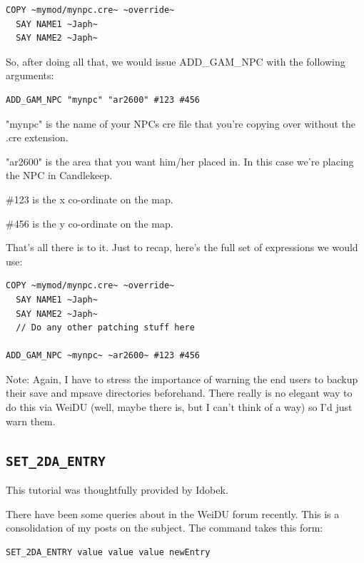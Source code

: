 \documentclass{article}
\def\ttref#1{\ahrefloc{#1}{\tt #1}}
\def\t#1{{\tt #1}}
\begin{document}
\begin{verbatim}
COPY ~mymod/mynpc.cre~ ~override~
  SAY NAME1 ~Japh~
  SAY NAME2 ~Japh~
\end{verbatim}

So, after doing all that, we would issue ADD_GAM_NPC with the following
arguments:

\begin{verbatim}
ADD_GAM_NPC "mynpc" "ar2600" #123 #456
\end{verbatim}

"mynpc" is the name of your NPCs cre file that you're copying over without
the .cre extension.

"ar2600" is the area that you want him/her placed in.  In this case we're
placing the NPC in Candlekeep.

\#123 is the x co-ordinate on the map.

\#456 is the y co-ordinate on the map.

That's all there is to it.  Just to recap, here's the full set of
expressions we would use:

\begin{verbatim}
COPY ~mymod/mynpc.cre~ ~override~
  SAY NAME1 ~Japh~
  SAY NAME2 ~Japh~
  // Do any other patching stuff here

ADD_GAM_NPC ~mynpc~ ~ar2600~ #123 #456
\end{verbatim}

Note: Again, I have to stress the importance of warning the end users to
backup their save and mpsave directories beforehand.  There really is no
elegant way to do this via WeiDU (well, maybe there is, but I can't think
of a way) so I'd just warn them.

\label{sec-set-2da-entry}\subsection{\t{SET_2DA_ENTRY}}

This tutorial was thoughtfully provided by Idobek.

There have been some queries about \ttref{SET_2DA_ENTRY} in the WeiDU
forum recently. This is a consolidation of my posts on the subject.
The command takes this form:

\begin{verbatim}
SET_2DA_ENTRY value value value newEntry
\end{verbatim}
\end{document}
